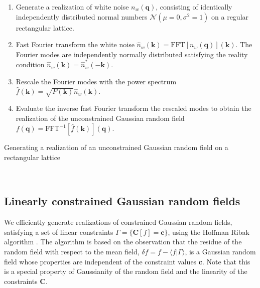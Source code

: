 \documentclass[a4paper, 11pt]{article}
\begin{document}
\begin{algorithm}[H]
\SetAlgoLined
\begin{enumerate}[itemsep=1ex, leftmargin=0cm, rightmargin=1cm]
\item Generate a realization of white noise $n_w(\bm{q})$, consisting of identically independently distributed normal numbers $\mathcal{N}(\mu=0,\sigma^2=1)$ on a regular rectangular lattice.
\item Fast Fourier transform the white noise $\hat{n}_w(\bm{k}) = \text{FFT}[n_w(\bm{q})](\bm{k})$. The Fourier modes are independently normally distributed satisfying the reality condition $\hat{n}_w(\bm{k}) = \hat{n}_w^*(-\bm{k})$.
\item Rescale the Fourier modes with the power spectrum $\hat{f}(\bm{k}) = \sqrt{P(\bm{k})}\hat{n}_w(\bm{k})$.
\item Evaluate the inverse fast Fourier transform the rescaled modes to obtain the realization of the unconstrained Gaussian random field $f(\bm{q}) = \text{FFT}^{-1}[\hat{f}(\bm{k})](\bm{q})$.
\end{enumerate}
 \caption{Generating a realization of an unconstrained Gaussian random field on a rectangular lattice}
 \label{alg:GRF}
\end{algorithm}$ $\\

\subsection{Linearly constrained Gaussian random fields}
We efficiently generate realizations of constrained Gaussian random fields, satisfying a set of linear constraints $\Gamma=\{\bm{C}[f]=\bm{c}\}$, using the Hoffman Ribak algorithm \cite{Hoffman:1991, Weygaert:1996}. The algorithm is based on the observation that the residue of the random field with respect to the mean field, $\delta f = f - \langle f | \Gamma\rangle$, is a Gaussian random field whose properties are independent of the constraint values $\bm{c}$. Note that this is a special property of Gaussianity of the random field and the linearity of the constraints $\bm{C}$.
\end{document}
